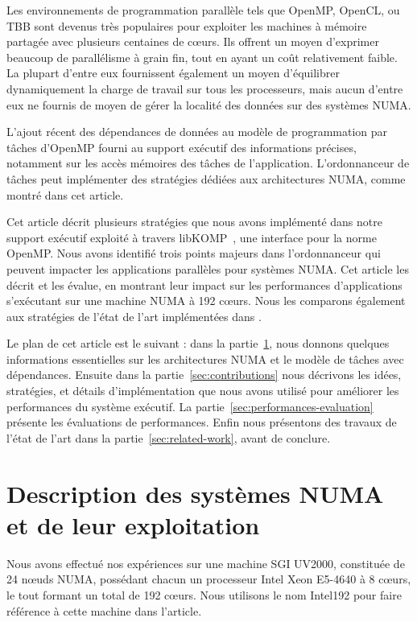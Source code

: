 \documentclass[parallelisme]{compas2016}
\begin{document}
Les environnements de programmation parallèle tels que OpenMP, OpenCL, ou TBB sont devenus très
populaires pour exploiter les machines à mémoire partagée avec plusieurs centaines de cœurs.
Ils offrent un moyen d'exprimer beaucoup de parallélisme à grain fin, tout en
ayant un coût relativement faible. La plupart d'entre eux fournissent également
un moyen d'équilibrer dynamiquement la charge de travail sur tous les processeurs,
mais aucun d'entre eux ne fournis de moyen de gérer la localité
des données sur des systèmes NUMA.

L'ajout récent des dépendances de données au modèle de programmation par tâches
d'OpenMP fourni au support exécutif des informations précises, notamment sur les
accès mémoires des tâches de l'application.
L'ordonnanceur de tâches peut implémenter des stratégies dédiées aux architectures
NUMA, comme montré dans cet article.

Cet article décrit plusieurs stratégies que nous avons implémenté dans notre support
exécutif \kaapi exploité à travers libKOMP~\cite{libkomp}, une interface pour la norme OpenMP.
Nous avons identifié trois points majeurs dans l'ordonnanceur qui
peuvent impacter les applications parallèles pour systèmes NUMA. Cet article les décrit et les évalue, en montrant leur impact sur les performances
d'applications s'exécutant sur une machine NUMA à 192 cœurs.
Nous les comparons également aux stratégies de l'état de l'art implémentées dans \kaapi.

Le plan de cet article est le suivant : dans la partie~\ref{sec:background},
nous donnons quelques informations essentielles sur les architectures NUMA et
le modèle de tâches avec dépendances. Ensuite dans la partie~\ref{sec:contributions}
nous décrivons les idées, stratégies, et détails d'implémentation que nous avons
utilisé pour améliorer les performances du système exécutif. La partie~\ref{sec:performances-evaluation}
présente les évaluations de performances. Enfin nous présentons des travaux de l'état
de l'art dans la partie~\ref{sec:related-work}, avant de conclure.


\vspace*{-1ex}
\section{Description des systèmes NUMA et de leur exploitation}

\label{sec:background}

Nous avons effectué nos expériences sur une machine SGI UV2000, constituée de
24 nœuds NUMA, possédant chacun un processeur Intel Xeon E5-4640 à 8 cœurs,
le tout formant un total de 192 cœurs. Nous utilisons le nom Intel192 pour faire
référence à cette machine dans l'article.
\end{document}
